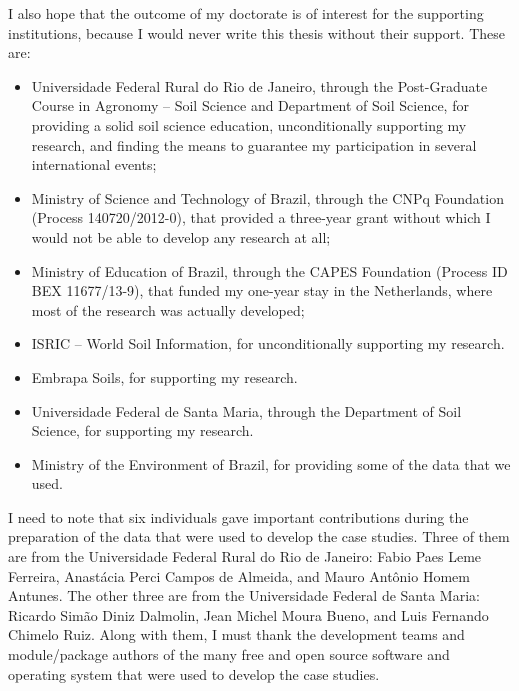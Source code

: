 I also hope that the outcome of my doctorate is of interest for the supporting institutions, 
because I would never write this thesis without their support. These are:

\begin{itemize}
 \item Universidade Federal Rural do Rio de Janeiro, through the Post-Graduate Course in Agronomy -- Soil 
Science
 and Department of Soil Science, for providing a solid soil science education, unconditionally supporting my 
 research, and finding the means to guarantee my participation in several international events;
 
 \item Ministry of Science and Technology of Brazil, through the CNPq Foundation (Process 140720/2012-0), that
 provided a three-year grant without which I would not be able to develop any research at all;
 
 \item Ministry of Education of Brazil, through the CAPES Foundation (Process ID BEX 11677/13-9), that funded
 my one-year stay in the Netherlands, where most of the research was actually developed;
 
 \item ISRIC -- World Soil Information, for unconditionally supporting my research.
 
 \item Embrapa Soils, for supporting my research.
 
 \item Universidade Federal de Santa Maria, through the Department of Soil Science, for supporting my research.

 \item Ministry of the Environment of Brazil, for providing some of the data that we used.
\end{itemize}

I need to note that six individuals gave important contributions during the preparation of the 
data that were used to develop the case studies. Three of them are from the Universidade 
Federal Rural do Rio de Janeiro: Fabio Paes Leme Ferreira, Anastácia Perci Campos de Almeida, and Mauro Antônio 
Homem Antunes. The other three are from the Universidade Federal de Santa Maria: Ricardo Simão Diniz Dalmolin, 
Jean Michel Moura Bueno, and Luis Fernando Chimelo Ruiz. Along with them, I must thank the development teams 
and module/package authors of the many free and open source software and operating system that were used to 
develop the case studies.

